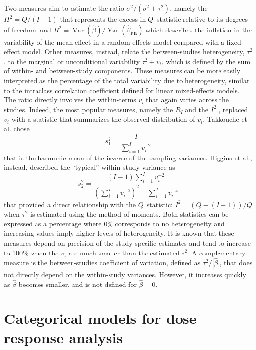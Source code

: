 \documentclass[11pt,a4paper,twoside,openany]{book}\usepackage{knitr}
\DeclareMathOperator{\Var}{Var}
\begin{document}
{Two measures aim to estimate the ratio $\sigma^2/(\sigma^2 + \tau^2)$, namely the $H^2= Q/(I-1)$ that represents the excess in $Q$~statistic relative to its degrees of freedom, and $R^2 = \Var\left(\hat \beta\right)/\Var\left(\hat \beta_{\text{FE}}\right)$ which describes the inflation in the variability of the mean effect in a random-effects model compared with a fixed-effect model.
Other measures, instead, relate the between-studies heterogeneity, $\tau^2$, to the marginal or unconditional variability $\tau^2 + v_i$, which is defined by the sum of within- and between-study components. These measures can be more easily interpreted as the percentage of the total variability due to heterogeneity, similar to the intraclass correlation coefficient defined for linear mixed-effects models. The ratio directly involves the within-terms $v_i$ that again varies across the studies. Indeed, the most popular measures, namely the $R_I$ \citep{ takkouche1999evaluation} and the $I^2$ \citep{higgins2002quantifying}, replaced $v_i$ with a statistic that summarizes the observed distribution of $v_i$.
Takkouche et al. chose
\begin{equation}
s_1^2 = \frac{I}{\sum_{i=1}^I v_i^{-2}}
\label{eq:Ri}
\end{equation}
\noindent that is the harmonic mean of the inverse of the sampling variances. 
Higgins et al., instead, described the ``typical'' within-study variance as
\begin{equation}
s_2^2 = \frac{(I-1) \sum_{i=1}^I v_i^{-2}}{ \left( \sum_{i=1}^I v_i^{-2} \right)^2 - \sum_{i=1}^I v_i^{-4}}
\label{eq:I2}
\end{equation}
\noindent that provided a direct relationship with the $Q$~statistic: $I^2 = (Q - (I-1))/Q$ when $\tau^2$ is estimated using the method of moments.
\noindent Both statistics can be expressed as a percentage where 0\% corresponds to no heterogeneity and increasing values imply higher levels of heterogeneity. It is known that these measures depend on precision of the study-specific estimates and tend to increase to 100\% when the $v_i$ are much smaller than the estimated $\tau^2$. 
A complementary measure is the between-studies coefficient of variation, defined as $\tau^2/|\hat \beta|$, that does not directly depend on the within-study variances. However, it increases quickly as $\hat \beta$ becomes smaller, and is not defined for $\hat \beta = 0$.



\section{Categorical models for dose--response analysis}

}
\end{document}
